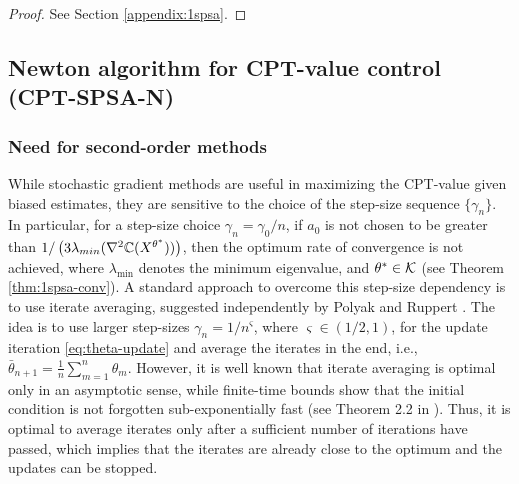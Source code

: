 \begin{proof}
 See Section \ref{appendix:1spsa}.
\end{proof}

\subsection{Newton algorithm for CPT-value control (CPT-SPSA-N)}
\label{sec:2spsa}
\subsubsection*{Need for second-order methods}
While stochastic gradient methods are useful in maximizing the CPT-value given biased estimates, they are sensitive to the choice of the step-size sequence $\{\gamma_n\}$.  In particular, for a step-size choice $\gamma_n = \gamma_0/n$, if $a_0$ is not chosen to be greater than $1/\left(3 \lambda_{min}(\nabla^2 \mathbb{C}(X^{\theta^*}))\right)$, then the optimum rate of convergence is not achieved, where $\lambda_{\min}$ denotes the minimum eigenvalue, and $\theta^*\in \mathcal{K}$ (see Theorem \ref{thm:1spsa-conv}). A standard approach to overcome this step-size dependency is to use iterate averaging, suggested independently by Polyak \cite{polyak1992acceleration} and Ruppert \cite{ruppert1991stochastic}. The idea is to use larger step-sizes $\gamma_n = 1/n^\varsigma$, where $\varsigma \in (1/2,1)$, for the update iteration \eqref{eq:theta-update} and average the iterates in the end, i.e., $\bar \theta_{n+1} = \frac1{n} \sum_{m=1}^n \theta_m$. However, it is well known  that iterate averaging is optimal only in an 
asymptotic sense, while finite-time bounds show that the initial condition is not forgotten sub-exponentially fast (see 
Theorem 2.2 in \cite{fathi2013transport}). 
Thus, it is optimal to average iterates only 
after a sufficient number of iterations have passed, which implies that the iterates are already close to the optimum and the updates can be stopped.

